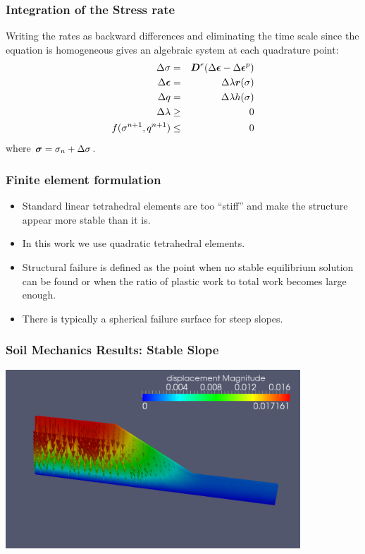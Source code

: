 \documentclass{beamer}
\begin{document}
\begin{frame}
  \frametitle{Integration of the Stress rate} Writing the rates as
  backward differences and eliminating the time scale since the
  equation is homogeneous gives an algebraic system at each quadrature
  point:
  \begin{eqnarray}
    \Delta \sigma  &=& \mbox{{\boldmath ${D}$}}^e (\Delta \mbox{{\boldmath ${\epsilon}$}} - \Delta \mbox{{\boldmath ${\epsilon}$}}^p) \\
    \Delta \mbox{{\boldmath ${\epsilon}$}} &=& \Delta \lambda \mbox{{\boldmath ${r}$}}(\sigma) \\
    \Delta q &=& \Delta \lambda h(\sigma) \\
    \Delta \lambda &\geq& 0 \\
    f(\sigma^{n+1},q^{n+1}) &\leq& 0 
  \end{eqnarray}
where $\mbox{{\boldmath ${\sigma}$}} = \sigma_n + \Delta \sigma$.
\end{frame}

\begin{frame}
\frametitle{Finite element formulation}
\begin{itemize}
\item Standard linear tetrahedral elements are too ``stiff'' and
  make the structure appear more stable than it is.
\item In this work we use quadratic tetrahedral elements.
\item Structural failure is defined as the point when no stable
  equilibrium solution can be found or when the ratio of plastic
  work to total work becomes large enough.
\item There is typically a spherical failure surface for steep
  slopes.
\end{itemize}
\end{frame}

\begin{frame}
\frametitle{Soil Mechanics Results: Stable Slope}
\includegraphics[width=4.35in]{mcslope.png}
\end{frame}
\end{document}
